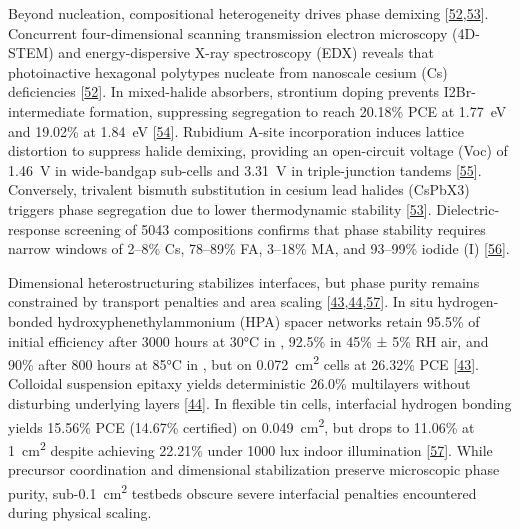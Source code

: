 \documentclass[
  11pt,
]{article}
\begin{document}
Beyond nucleation, compositional heterogeneity drives phase demixing
{[}\href{https://doi.org/10.1002/adma.74382}{52},\href{https://doi.org/10.1016/j.solmat.2026.114597}{53}{]}.
Concurrent four-dimensional scanning transmission electron microscopy
(4D-STEM) and energy-dispersive X-ray spectroscopy (EDX) reveals that
photoinactive hexagonal polytypes nucleate from nanoscale cesium (Cs)
deficiencies {[}\href{https://doi.org/10.1002/adma.74382}{52}{]}. In
mixed-halide absorbers, strontium doping prevents I2Br- intermediate
formation, suppressing segregation to reach 20.18\% PCE at
\qty{1.77}{\electronvolt} and 19.02\% at \qty{1.84}{\electronvolt}
{[}\href{https://doi.org/10.1021/acsenergylett.6c01113}{54}{]}. Rubidium
A-site incorporation induces lattice distortion to suppress halide
demixing, providing an open-circuit voltage (Voc) of \qty{1.46}{\volt}
in wide-bandgap sub-cells and \qty{3.31}{\volt} in triple-junction
tandems {[}\href{https://doi.org/10.1002/adfm.76715}{55}{]}. Conversely,
trivalent bismuth substitution in cesium lead halides (CsPbX3) triggers
phase segregation due to lower thermodynamic stability
{[}\href{https://doi.org/10.1016/j.solmat.2026.114597}{53}{]}.
Dielectric-response screening of 5043 compositions confirms that phase
stability requires narrow windows of 2--8\% Cs, 78--89\% FA, 3--18\% MA,
and 93--99\% iodide (I)
{[}\href{https://doi.org/10.26434/chemrxiv.15005541/v1}{56}{]}.

Dimensional heterostructuring stabilizes interfaces, but phase purity
remains constrained by transport penalties and area scaling
{[}\href{https://doi.org/10.1002/advs.76508}{43},\href{https://doi.org/10.26434/chemrxiv.15006632/v1}{44},\href{https://doi.org/10.1002/anie.7827890}{57}{]}.
In situ hydrogen-bonded hydroxyphenethylammonium (HPA) spacer networks
retain 95.5\% of initial efficiency after 3000 hours at 30°C in ,
92.5\% in 45\% ± 5\% RH air, and 90\% after 800 hours at 85°C in
, but on \qty{0.072}{\centi\meter\squared} cells at 26.32\% PCE
{[}\href{https://doi.org/10.1002/advs.76508}{43}{]}. Colloidal
suspension epitaxy yields deterministic 26.0\% multilayers without
disturbing underlying layers
{[}\href{https://doi.org/10.26434/chemrxiv.15006632/v1}{44}{]}. In
flexible tin cells, interfacial hydrogen bonding yields 15.56\% PCE
(14.67\% certified) on \qty{0.049}{\centi\meter\squared}, but drops to
11.06\% at \qty{1}{\centi\meter\squared} despite achieving 22.21\% under
1000 lux indoor illumination
{[}\href{https://doi.org/10.1002/anie.7827890}{57}{]}. While precursor
coordination and dimensional stabilization preserve microscopic phase
purity, sub-\qty{0.1}{\centi\meter\squared} testbeds obscure severe
interfacial penalties encountered during physical scaling.
\end{document}
